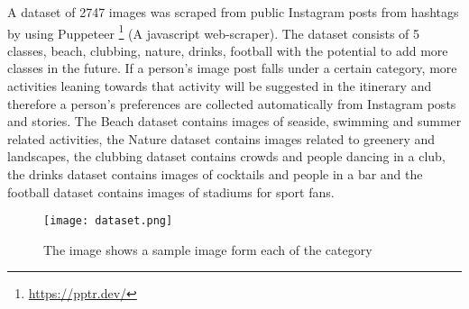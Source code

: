 A dataset of 2747 images was scraped from public Instagram posts from
hashtags by using Puppeteer \footnote{\url{https://pptr.dev/}} (A
javascript web-scraper). The dataset consists of 5 classes, beach,
clubbing, nature, drinks, football with the potential to add more
classes in the future. If a person’s image post falls under a certain
category, more activities leaning towards that activity will be
suggested in the itinerary and therefore a person’s preferences are
collected automatically from Instagram posts and stories. The Beach
dataset contains images of seaside, swimming and summer related
activities, the Nature dataset contains images related to greenery and
landscapes, the clubbing dataset contains crowds and people dancing in
a club, the drinks dataset contains images of cocktails and people in
a bar and the football dataset contains images of stadiums for sport
fans. 

    \begin{figure}[H]
        \caption{The image shows a sample image form each of the category}
        \centering
        \texttt{[image: dataset.png]}
        \label{dataset}
    \end{figure}